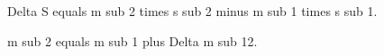 Delta S equals m sub 2 times s sub 2 minus m sub 1 times s sub 1.  

m sub 2 equals m sub 1 plus Delta m sub 12.